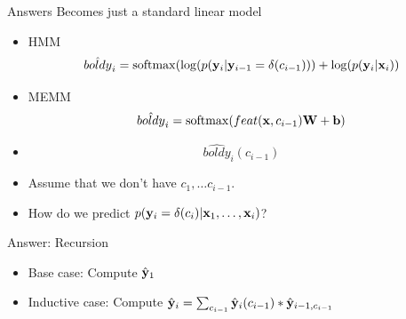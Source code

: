 \documentclass{beamer}
\begin{document}
\begin{frame}{Answers}
  Becomes just a standard linear model

  \begin{itemize}
  \item HMM
    \[ \hat{boldy}_i = \softmax(\log(p(\boldy_i| \boldy_{i-1} = \delta(c_{i-1}))) + \log(p(\boldy_i| \boldx_i) )  \] 

    \air 
  \item MEMM
    \[ \hat{boldy}_i = \softmax(feat(\boldx, c_{i-1}) \boldW + \bold b)  \] 
    \air 
  \item \[ \hat{boldy}_i(c_{i-1}) \] 
  \end{itemize}
\end{frame}

\begin{frame}{}
  \begin{itemize}
  \item Assume that we don't have $c_1, \ldots c_{i-1}$.
    \air 
  \item How do we predict $p(\mathbf{y}_i = \delta(c_i) | \mathbf{x}_1, \ldots, \mathbf{x}_i)$? 
  \end{itemize}
\end{frame}

\begin{frame}{Answer: Recursion}
  \begin{itemize}
  \item Base case: Compute $\hat{\mathbf{y}}_1$ 

  \item Inductive case: Compute $\hat{\mathbf{y}}_i = \sum_{c_{i-1}} \hat{\mathbf{y}}_i(c_{i-1}) * \hat{\mathbf{y}}_{i-1, c_{i-1}}$ 
  \end{itemize}
\end{frame}
\end{document}
